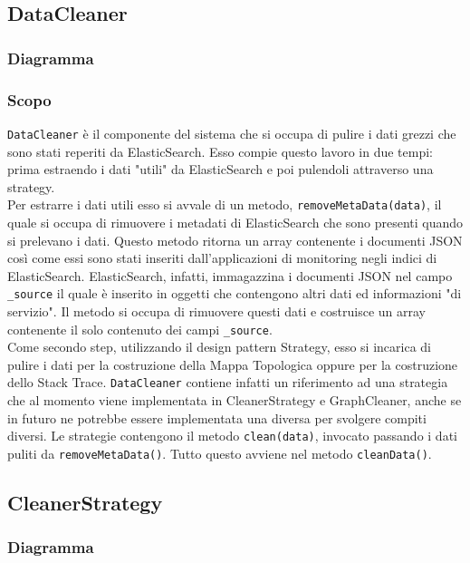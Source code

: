 \subsection{DataCleaner}
\label{sec:DataCleaner}
	\subsubsection{Diagramma}
	
	\subsubsection{Scopo}
	\texttt{DataCleaner} è il componente del sistema che si occupa di pulire i dati grezzi che sono stati reperiti da ElasticSearch. Esso compie questo lavoro in due tempi: prima estraendo i dati "utili" da ElasticSearch e poi pulendoli attraverso una strategy.\\
	Per estrarre i dati utili esso si avvale di un metodo, \texttt{removeMetaData(data)}, il quale si occupa di rimuovere i metadati di ElasticSearch che sono presenti quando si prelevano i dati. Questo metodo ritorna un array contenente i documenti JSON così come essi sono stati inseriti dall'applicazioni di monitoring negli indici di ElasticSearch. ElasticSearch, infatti, immagazzina i documenti JSON nel campo \texttt{\_source} il quale è inserito in oggetti che contengono altri dati ed informazioni "di servizio". Il metodo si occupa di rimuovere questi dati e costruisce un array contenente il solo contenuto dei campi \texttt{\_source}.\\
	Come secondo step, utilizzando il design pattern Strategy, esso si incarica di pulire i dati per la costruzione della Mappa Topologica oppure per la costruzione dello Stack Trace. \texttt{DataCleaner} contiene infatti un riferimento ad una strategia che al momento viene implementata in CleanerStrategy e GraphCleaner, anche se in futuro ne potrebbe essere implementata una diversa per svolgere compiti diversi. Le strategie contengono il metodo \texttt{clean(data)}, invocato passando i dati puliti da \texttt{removeMetaData()}. Tutto questo avviene nel metodo \texttt{cleanData()}.
	
\subsection{CleanerStrategy}
\label{sec:CleanerStrategy}
	\subsubsection{Diagramma}

